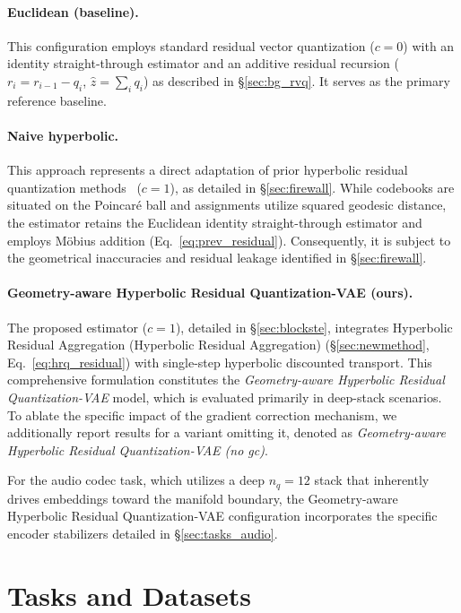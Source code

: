 \documentclass[12pt]{report}
\begin{document}
\paragraph{Euclidean (baseline).} This configuration employs standard residual vector quantization ($c=0$) with an identity straight-through estimator and an additive residual recursion ($r_i = r_{i-1}-q_i$, $\hat z=\sum_i q_i$) as described in \S\ref{sec:bg_rvq}. It serves as the primary reference baseline.

\paragraph{Naive hyperbolic.} This approach represents a direct adaptation of prior hyperbolic residual quantization methods~\cite{hrqvae} ($c=1$), as detailed in \S\ref{sec:firewall}. While codebooks are situated on the Poincar\'e ball and assignments utilize squared geodesic distance, the estimator retains the Euclidean identity straight-through estimator and employs M\"obius addition (Eq.~\ref{eq:prev_residual}). Consequently, it is subject to the geometrical inaccuracies and residual leakage identified in \S\ref{sec:firewall}.

\paragraph{Geometry-aware Hyperbolic Residual Quantization-VAE (ours).} The proposed estimator ($c=1$), detailed in \S\ref{sec:blockste}, integrates Hyperbolic Residual Aggregation (Hyperbolic Residual Aggregation) (\S\ref{sec:newmethod}, Eq.~\ref{eq:hrq_residual}) with single-step hyperbolic discounted transport. This comprehensive formulation constitutes the \emph{Geometry-aware Hyperbolic Residual Quantization-VAE} model, which is evaluated primarily in deep-stack scenarios. To ablate the specific impact of the gradient correction mechanism, we additionally report results for a variant omitting it, denoted as \emph{Geometry-aware Hyperbolic Residual Quantization-VAE (no gc)}.

For the audio codec task, which utilizes a deep $n_q=12$ stack that inherently drives embeddings toward the manifold boundary, the Geometry-aware Hyperbolic Residual Quantization-VAE configuration incorporates the specific encoder stabilizers detailed in \S\ref{sec:tasks_audio}.

\section{Tasks and Datasets}
\label{sec:tasks}
\end{document}
